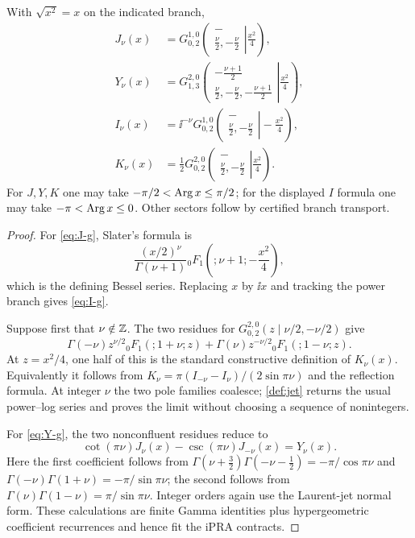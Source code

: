 \begin{theorem}\label{thm:bessel-g}
With $\sqrt{x^2}=x$ on the indicated branch,
\begin{align}
 J_\nu(x)
 &=G_{0,2}^{1,0}\!\left(
  \left.\begin{matrix}-\\\frac\nu2,-\frac\nu2\end{matrix}\right|
  \frac{x^2}{4}\right),
 \label{eq:J-g}\\
 Y_\nu(x)
 &=G_{1,3}^{2,0}\!\left(
  \left.\begin{matrix}-\frac{\nu+1}{2}\\
  \frac\nu2,-\frac\nu2,-\frac{\nu+1}{2}\end{matrix}\right|
  \frac{x^2}{4}\right),
 \label{eq:Y-g}\\
 I_\nu(x)
 &=\ii^{-\nu}G_{0,2}^{1,0}\!\left(
  \left.\begin{matrix}-\\\frac\nu2,-\frac\nu2\end{matrix}\right|
  -\frac{x^2}{4}\right),
 \label{eq:I-g}\\
 K_\nu(x)
 &=\frac12G_{0,2}^{2,0}\!\left(
  \left.\begin{matrix}-\\\frac\nu2,-\frac\nu2\end{matrix}\right|
  \frac{x^2}{4}\right).
 \label{eq:K-g}
\end{align}
For $J,Y,K$ one may take $-\pi/2<\operatorname{Arg} x\le\pi/2$; for the displayed $I$
formula one may take $-\pi<\operatorname{Arg} x\le0$.  Other sectors follow by certified
branch transport.
\end{theorem}
\begin{proof}
For \eqref{eq:J-g}, Slater's formula is
\[
 \frac{(x/2)^\nu}{\Gamma(\nu+1)}
 {}_0F_1\!\left(;\nu+1;-\frac{x^2}{4}\right),
\]
which is the defining Bessel series.  Replacing $x$ by $\ii x$ and tracking the
power branch gives \eqref{eq:I-g}.

Suppose first that $\nu\notin\mathbb Z$.  The two residues for
$G_{0,2}^{2,0}(z\mid\nu/2,-\nu/2)$ give
\[
 \Gamma(-\nu)z^{\nu/2}{}_0F_1(;1+\nu;z)
 +\Gamma(\nu)z^{-\nu/2}{}_0F_1(;1-\nu;z).
\]
At $z=x^2/4$, one half of this is the standard constructive definition of
$K_\nu(x)$.  Equivalently it follows from
$K_\nu=\pi(I_{-\nu}-I_\nu)/(2\sin\pi\nu)$ and the reflection formula.  At
integer $\nu$ the two pole families coalesce; \cref{def:jet} returns the usual
power--log series and proves the limit without choosing a sequence of
nonintegers.

For \eqref{eq:Y-g}, the two nonconfluent residues reduce to
\[
 \cot(\pi\nu)J_\nu(x)-\csc(\pi\nu)J_{-\nu}(x)
 =Y_\nu(x).
\]
Here the first coefficient follows from
$\Gamma(\nu+\tfrac32)\Gamma(-\nu-\tfrac12)=-\pi/\cos\pi\nu$ and
$\Gamma(-\nu)\Gamma(1+\nu)=-\pi/\sin\pi\nu$; the second follows from
$\Gamma(\nu)\Gamma(1-\nu)=\pi/\sin\pi\nu$.  Integer orders again use the
Laurent-jet normal form.  These calculations are finite Gamma identities plus
hypergeometric coefficient recurrences and hence fit the iPRA contracts.
\end{proof}

